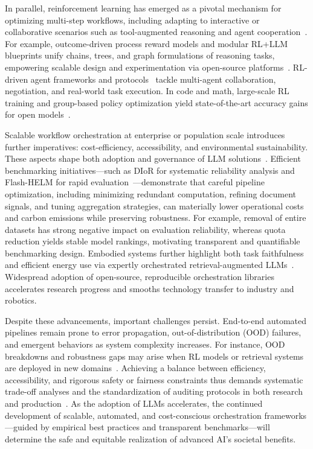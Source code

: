 \documentclass[sigconf]{acmart}
\begin{document}
In parallel, reinforcement learning has emerged as a pivotal mechanism for optimizing multi-step workflows, including adapting to interactive or collaborative scenarios such as tool-augmented reasoning and agent cooperation~\cite{ref8,ref9,ref12,ref37,ref55,ref57,ref60,ref64,ref86}. For example, outcome-driven process reward models and modular RL+LLM blueprints unify chains, trees, and graph formulations of reasoning tasks, empowering scalable design and experimentation via open-source platforms~\cite{ref12}. RL-driven agent frameworks and protocols~\cite{ref55,ref60} tackle multi-agent collaboration, negotiation, and real-world task execution. In code and math, large-scale RL training and group-based policy optimization yield state-of-the-art accuracy gains for open models~\cite{ref57}.

Scalable workflow orchestration at enterprise or population scale introduces further imperatives: cost-efficiency, accessibility, and environmental sustainability. These aspects shape both adoption and governance of LLM solutions~\cite{ref37,ref43,ref55,ref88,ref104}. Efficient benchmarking initiatives---such as DIoR for systematic reliability analysis and Flash-HELM for rapid evaluation~\cite{ref104}---demonstrate that careful pipeline optimization, including minimizing redundant computation, refining document signals, and tuning aggregation strategies, can materially lower operational costs and carbon emissions while preserving robustness. For example, removal of entire datasets has strong negative impact on evaluation reliability, whereas quota reduction yields stable model rankings, motivating transparent and quantifiable benchmarking design. Embodied systems further highlight both task faithfulness and efficient energy use via expertly orchestrated retrieval-augmented LLMs~\cite{ref37}. Widespread adoption of open-source, reproducible orchestration libraries~\cite{ref12,ref43,ref64,ref79,ref86} accelerates research progress and smooths technology transfer to industry and robotics.

Despite these advancements, important challenges persist. End-to-end automated pipelines remain prone to error propagation, out-of-distribution (OOD) failures, and emergent behaviors as system complexity increases. For instance, OOD breakdowns and robustness gaps may arise when RL models or retrieval systems are deployed in new domains~\cite{ref9,ref43,ref80,ref104}. Achieving a balance between efficiency, accessibility, and rigorous safety or fairness constraints thus demands systematic trade-off analyses and the standardization of auditing protocols in both research and production~\cite{ref8,ref43,ref80,ref104}. As the adoption of LLMs accelerates, the continued development of scalable, automated, and cost-conscious orchestration frameworks---guided by empirical best practices and transparent benchmarks---will determine the safe and equitable realization of advanced AI's societal benefits.
\end{document}
